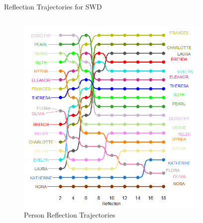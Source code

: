\documentclass[
  ignorenonframetext,
]{beamer}
\begin{document}
\begin{frame}{Reflection Trajectories for SWD}
\protect\hypertarget{reflection-trajectories-for-swd}{}
\begin{columns}[T]
\begin{column}{0.5\textwidth}
\begin{figure}

{\centering \includegraphics{Plots/p-reflections-sw.png}

}

\caption{Person Reflection Trajectories}

\end{figure}
\end{column}

\begin{column}{0.5\textwidth}
\begin{figure}


\end{figure}
\end{column}
\end{columns}
\end{frame}
\end{document}
